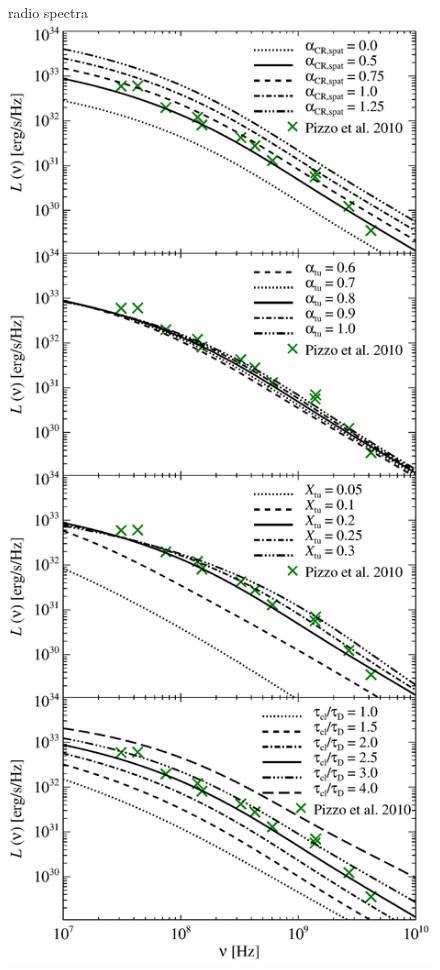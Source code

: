 \documentclass[fleqn,usenatbib,useAMS]{mnras}
\begin{document}
\begin{figure}
\begin{minipage}{1\columnwidth}
\begin{center}
   \end{center}
\end{minipage}
\begin{minipage}{1\columnwidth}
   \begin{center}\Large{radio spectra}\\
     \includegraphics[width=\columnwidth]{figure7_spec.eps}

\end{center}
\end{minipage}
\end{figure}
\end{document}
